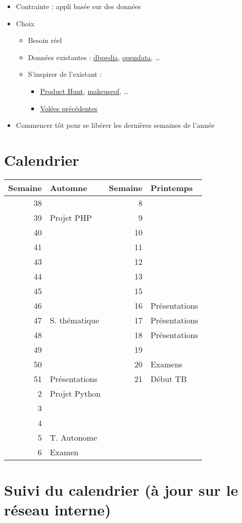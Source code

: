 \begin{itemize}
\tightlist
\item
  Contrainte : appli basée sur des données
\item
  Choix

  \begin{itemize}
  \tightlist
  \item
    Besoin réel
  \item
    Données existantes : \href{http://wiki.dbpedia.org/}{dbpedia},
    \href{https://opendata.swiss/fr/}{opendata}, \ldots{}
  \item
    S'inspirer de l'existant :

    \begin{itemize}
    \tightlist
    \item
      \href{https://www.producthunt.com/topics/web-app}{Product Hunt},
      \href{http://www.makeuseof.com/tag/best-websites-internet/}{makeuseof},
      \ldots{}
    \item
      \href{https://he-arc.github.io}{Volées précédentes}
    \end{itemize}
  \end{itemize}
\item
  Commencer tôt pour se libérer les dernières semaines de l'année
\end{itemize}

\hypertarget{calendrier}{%
\section{Calendrier}\label{calendrier}}

\begin{longtable}[]{@{}rlrl@{}}
\toprule
Semaine & Automne & Semaine & Printemps\tabularnewline
\midrule
\endhead
38 & & 8 &\tabularnewline
39 & Projet PHP & 9 &\tabularnewline
40 & & 10 &\tabularnewline
41 & & 11 &\tabularnewline
43 & & 12 &\tabularnewline
44 & & 13 &\tabularnewline
45 & & 15 &\tabularnewline
46 & & 16 & Présentations\tabularnewline
47 & S. thématique & 17 & Présentations\tabularnewline
48 & & 18 & Présentations\tabularnewline
49 & & 19 &\tabularnewline
50 & & 20 & Examens\tabularnewline
51 & Présentations & 21 & Début TB\tabularnewline
2 & Projet Python & &\tabularnewline
3 & & &\tabularnewline
4 & & &\tabularnewline
5 & T. Autonome & &\tabularnewline
6 & Examen & &\tabularnewline
\bottomrule
\end{longtable}

\hypertarget{suivi-du-calendrier-uxe0-jour-sur-le-ruxe9seau-interne}{%
\section{Suivi du calendrier (à jour sur le réseau
interne)}\label{suivi-du-calendrier-uxe0-jour-sur-le-ruxe9seau-interne}}

